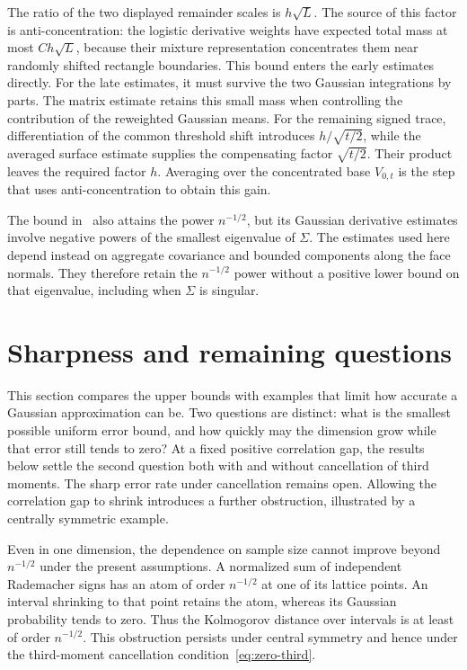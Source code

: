 \documentclass[11pt,letterpaper]{article}
\theoremstyle{remark}
\begin{document}
The ratio of the two displayed remainder scales is \(h\sqrt L\).
The source of this factor is anti-concentration: the logistic
derivative weights have expected total mass at most \(Ch\sqrt L\),
because their mixture representation concentrates them near randomly
shifted rectangle boundaries. This bound enters the early estimates
directly. For the late estimates, it must survive the two Gaussian
integrations by parts. The matrix estimate retains this small mass
when controlling the contribution of the reweighted Gaussian means.
For the remaining signed trace, differentiation of the common
threshold shift introduces \(h/\sqrt{t/2}\), while the averaged
surface estimate supplies the compensating factor \(\sqrt{t/2}\).
Their product leaves the required factor \(h\). Averaging over the
concentrated base \(V_{0,t}\) is the step that uses anti-concentration
to obtain this gain.

The bound in~\cite{AL} also attains the power \(n^{-1/2}\), but its
Gaussian derivative estimates involve negative powers of the
smallest eigenvalue of \(\Sigma\). The estimates used here depend
instead on aggregate covariance and bounded components along the
face normals. They therefore retain the \(n^{-1/2}\) power without
a positive lower bound on that eigenvalue, including when
\(\Sigma\) is singular.


\section{Sharpness and remaining questions}\label{opt:section}
This section compares the upper bounds with examples that limit how
accurate a Gaussian approximation can be. Two questions are distinct:
what is the smallest possible uniform error bound, and how quickly may
the dimension grow while that error still tends to zero? At a fixed
positive correlation gap, the results below settle the second question
both with and without cancellation of third moments. The sharp error
rate under cancellation remains open. Allowing the correlation gap to
shrink introduces a further obstruction, illustrated by a centrally
symmetric example.

Even in one dimension, the dependence on sample size cannot improve
beyond \(n^{-1/2}\) under the present assumptions. A normalized sum of
independent Rademacher signs has an atom of order \(n^{-1/2}\) at one
of its lattice points. An interval shrinking to that point retains the
atom, whereas its Gaussian probability tends to zero. Thus the
Kolmogorov distance over intervals is at least of order \(n^{-1/2}\).
This obstruction persists under central symmetry and hence under the
third-moment cancellation condition~\eqref{eq:zero-third}.
\end{document}
